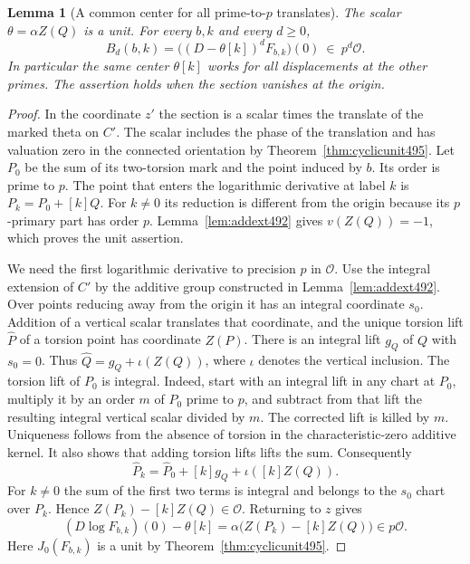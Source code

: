 \documentclass[a4paper,11pt]{article}
\newtheorem{lemma}[proposition]{Lemma}
\theoremstyle{definition}
\theoremstyle{remark}
\numberwithin{equation}{section}
\begin{document}
\begin{lemma}[A common center for all prime-to-\(p\) translates]
\leavevmode\label{lem:connectedcenter516}
The scalar \(\theta=\alpha Z(Q)\) is a unit. For every \(b,k\)
and every \(d\ge0\),
\[
 B_d(b,k)=\big((D-\theta[k])^dF_{b,k}\big)(0)
                         \ \in\ p^d\mathcal O.
\]
In particular the same center \(\theta[k]\) works for all
displacements at the other primes. The assertion holds when
the section vanishes at the origin.
\end{lemma}
\begin{proof}
In the coordinate \(z'\) the section is a scalar times the
translate of the marked theta on \(C'\). The scalar includes
the phase of the translation and has valuation zero in the
connected orientation by Theorem~\ref{thm:cyclicunit495}.
Let \(P_0\) be the sum of its two-torsion mark and the point
induced by \(b\). Its order is prime to \(p\). The point that
enters the logarithmic derivative at label \(k\) is
\(P_k=P_0+[k]Q\). For \(k\ne0\) its reduction is different from
the origin because its \(p\)-primary part has order \(p\).
Lemma~\ref{lem:addext492} gives \(v(Z(Q))=-1\), which proves the
unit assertion.

We need the first logarithmic derivative to precision \(p\) in
\(\mathcal O\). Use the integral extension of \(C'\) by the
additive group constructed in Lemma~\ref{lem:addext492}. Over
points reducing away from the origin it has an integral coordinate
\(s_0\). Addition of a vertical scalar translates that coordinate,
and the unique torsion lift \(\widehat P\) of a torsion point has
coordinate \(Z(P)\). There is an integral lift \(g_Q\) of \(Q\)
with \(s_0=0\). Thus \(\widehat Q=g_Q+\iota(Z(Q))\), where
\(\iota\) denotes the vertical inclusion. The torsion lift of
\(P_0\) is integral. Indeed, start with an integral lift in any
chart at \(P_0\), multiply it by an order \(m\) of \(P_0\)
prime to \(p\), and subtract from that lift the resulting integral
vertical scalar divided by \(m\). The corrected lift is killed
by \(m\). Uniqueness follows from the absence of torsion in the
characteristic-zero additive kernel. It also shows that adding
torsion lifts lifts the sum. Consequently
\[
    \widehat P_k=\widehat P_0+[k]g_Q+\iota([k]Z(Q)).
\]
For \(k\ne0\) the sum of the first two terms is integral and
belongs to the \(s_0\) chart over \(P_k\). Hence
\(Z(P_k)-[k]Z(Q)\in\mathcal O\). Returning to \(z\) gives
\[
  (D\log F_{b,k})(0)-\theta[k]
        =\alpha\bigl(Z(P_k)-[k]Z(Q)\bigr)\in p\mathcal O .
\]
Here \(J_0(F_{b,k})\) is a unit by Theorem~\ref{thm:cyclicunit495}.


\end{proof}
\end{document}
